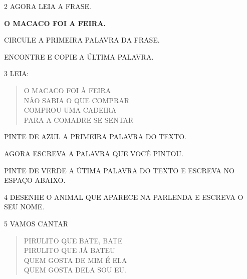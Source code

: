 \num{2} AGORA LEIA A FRASE.

\textbf{O MACACO FOI A FEIRA.}

\begin{escolha}
\item CIRCULE A PRIMEIRA PALAVRA DA FRASE.

\item ENCONTRE E COPIE A ÚLTIMA PALAVRA.

\end{escolha}

\num{3} LEIA:

\begin{verse}
O MACACO FOI À FEIRA\\
NÃO SABIA O QUE COMPRAR\\
COMPROU UMA CADEIRA\\
PARA A COMADRE SE SENTAR
\end{verse}


\begin{escolha}
\item PINTE DE AZUL A PRIMEIRA PALAVRA DO TEXTO.

\item AGORA ESCREVA A PALAVRA QUE VOCÊ PINTOU.


\item PINTE DE VERDE A ÚTIMA PALAVRA DO TEXTO E ESCREVA NO ESPAÇO ABAIXO.

\end{escolha}

\num{4} DESENHE O ANIMAL QUE APARECE NA PARLENDA E ESCREVA O SEU NOME.

\begin{mdframed}[linewidth=2pt,linecolor=salmao,roundcorner=2pt]
\vspace{10cm}
\end{mdframed}

\num{5} VAMOS CANTAR


\begin{verse}
PIRULITO QUE BATE, BATE\\
PIRULITO QUE JÁ BATEU\\
QUEM GOSTA DE MIM É ELA\\
QUEM GOSTA DELA SOU EU.
\end{verse}

